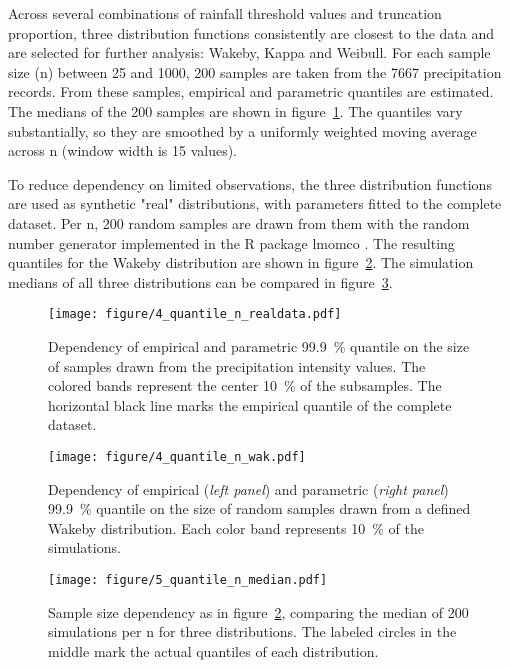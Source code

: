 \documentclass[a4paper]{article}
\begin{document}
\begin{multicols}{2}
Across several combinations of rainfall threshold values and truncation proportion, three distribution functions consistently are closest to the data and are selected for further analysis: Wakeby, Kappa and Weibull. 
For each sample size (n) between 25 and 1000, 200 samples are taken from the 7667 precipitation records.
From these samples, empirical and parametric quantiles are estimated.
The medians of the 200 samples are shown in figure~\ref{fig:quantnreal}.
The quantiles vary substantially, so they are smoothed by a uniformly weighted moving average across n (window width is 15 values).

To reduce dependency on limited observations, the three distribution functions are used as synthetic "real" distributions, with parameters fitted to the complete dataset.
Per n, 200 random samples are drawn from them with the random number generator implemented in the R package lmomco \citep{asquith_lmomco:_2015}.
The resulting quantiles for the Wakeby distribution are shown in figure~\ref{fig:quantnwak}.
The simulation medians of all three distributions can be compared in figure~\ref{fig:quantnmedian}.

\begin{figure}[H] %
\texttt{[image: figure/4\_quantile\_n\_realdata.pdf]}
\caption[Sample size dependency observed data]{Dependency of empirical and parametric 99.9~\% quantile on the size of samples drawn from the precipitation intensity values. The colored bands represent the center 10~\% of the subsamples. The horizontal black line marks the empirical quantile of the complete dataset.}
\label{fig:quantnreal}
\end{figure}

\end{multicols}

\begin{figure}[H] %
\texttt{[image: figure/4\_quantile\_n\_wak.pdf]}
\caption[Sample size dependency Wakeby]{Dependency of empirical (\textit{left panel}) and parametric (\textit{right panel}) 99.9~\% quantile on the size of random samples drawn from a defined Wakeby distribution. Each color band represents 10~\% of the simulations.}
\label{fig:quantnwak}
\end{figure}

\begin{figure}[H] %
\texttt{[image: figure/5\_quantile\_n\_median.pdf]}
\caption[Sample size dependency medians]{Sample size dependency as in figure~\ref{fig:quantnwak}, comparing the median of 200 simulations per n for three distributions. The labeled circles in the middle mark the actual quantiles of each distribution.}
\label{fig:quantnmedian}
\end{figure}
\end{document}
